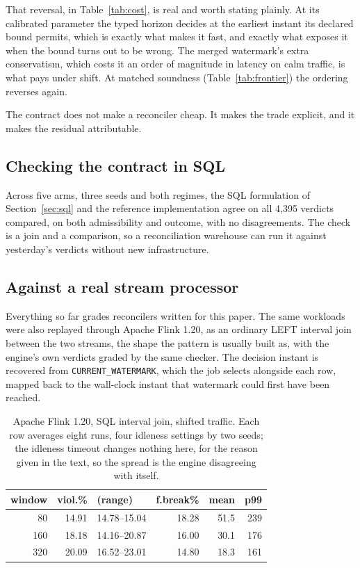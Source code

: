 \documentclass[10pt,conference]{IEEEtran}
\begin{document}
That reversal, in Table~\ref{tab:cost}, is real and worth stating plainly. At its calibrated parameter the
typed horizon decides at the earliest instant its declared bound permits, which is exactly what makes it fast, and exactly what exposes it when the
bound turns out to be wrong. The merged watermark's extra conservatism, which costs it
an order of magnitude in latency on calm traffic, is what pays under shift. At
matched soundness (Table~\ref{tab:frontier}) the ordering reverses again.

The contract does not make a reconciler cheap. It makes the trade explicit, and
it makes the residual attributable.

\subsection{Checking the contract in SQL}

Across five arms, three seeds and both regimes, the SQL formulation of
Section~\ref{sec:sql} and the reference implementation agree on all 4{,}395
verdicts compared, on both admissibility and outcome, with no disagreements.
The check is a join and a comparison, so a reconciliation warehouse can run it
against yesterday's verdicts without new infrastructure.

\subsection{Against a real stream processor}
\label{sec:flink}

Everything so far grades reconcilers written for this paper. The same
workloads were also replayed through Apache Flink 1.20, as an ordinary LEFT interval join between the two streams, the shape the
pattern is usually built as, with the engine's own verdicts graded by the same
checker. The decision
instant is recovered from \texttt{CURRENT\_WATERMARK}, which the job selects
alongside each row, mapped back to the wall-clock instant that watermark could
first have been reached.

\begin{table}[t]
\caption{Apache Flink 1.20, SQL interval join, shifted traffic. Each row
averages eight runs, four idleness settings by two seeds; the idleness timeout
changes nothing here, for the reason given in the text, so the spread is the
engine disagreeing with itself.}
\label{tab:flink}
\centering
\footnotesize
\begin{tabular}{rrlrrr}
\toprule
window & viol.\% & (range) & f.break\% & mean & p99 \\
\midrule
80  & 14.91 & 14.78--15.04 & 18.28 & 51.5 & 239 \\
160 & 18.18 & 14.16--20.87 & 16.00 & 30.1 & 176 \\
320 & 20.09 & 16.52--23.01 & 14.80 & 18.3 & 161 \\
\bottomrule
\end{tabular}
\end{table}
\end{document}
